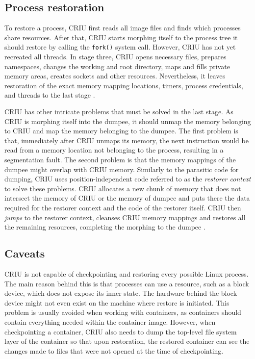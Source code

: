 \documentclass[
  digital,     %
  oneside,     %
  nosansbold,  %
  nocolorbold, %
  lof,         %
  nolot,         %
]{fithesis4}
\begin{document}
\subsection{Process restoration}
To restore a process, CRIU first reads all image files and finds which processes share resources. After that, CRIU starts morphing itself to the process tree it should restore by calling the \texttt{fork()} system call. However, CRIU has not yet recreated all threads. In stage three, CRIU opens necessary files, prepares namespaces, changes the working and root directory, maps and fills private memory areas, creates sockets and other resources. Nevertheless, it leaves restoration of the exact memory mapping locations, timers, process credentials, and threads to the last stage \cite{criu_cr}.

CRIU has other intricate problems that must be solved in the last stage. As CRIU is morphing itself into the dumpee, it should unmap the memory belonging to CRIU and map the memory belonging to the dumpee. The first problem is that, immediately after CRIU unmaps its memory, the next instruction would be read from a memory location not belonging to the process, resulting in a segmentation fault. The second problem is that the memory mappings of the dumpee might overlap with CRIU memory. Similarly to the parasitic code for dumping, CRIU uses position-independent code referred to as the \emph{restorer context} to solve these problems. CRIU allocates a new chunk of memory that does not intersect the memory of CRIU or the memory of dumpee and puts there the data required for the restorer context and the code of the restorer itself. CRIU then \emph{jumps} to the restorer context, cleanses CRIU memory mappings and restores all the remaining resources, completing the morphing to the dumpee \cite{criu_restorer}.


\subsection{Caveats}
CRIU is not capable of checkpointing and restoring every possible Linux process. The main reason behind this is that processes can use a resource, such as a block device, which does not expose its inner state. The hardware behind the block device might not even exist on the machine where restore is initiated. This problem is usually avoided when working with containers, as containers should contain everything needed within the container image. However, when checkpointing a container, CRIU also needs to dump the top-level file system layer of the container so that upon restoration, the restored container can see the changes made to files that were not opened at the time of checkpointing.
\end{document}
